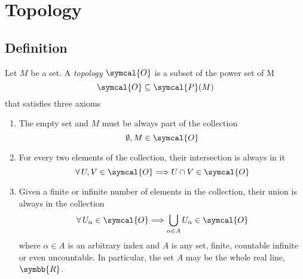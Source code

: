 \section{Topology}
\subsection{Definition}
Let $M$ be a set. A \emph{topology}\footnotemark{} $\symcal{O}$ is a subset of the power
set of M
\begin{equation}
  \symcal{O} \subseteq \symcal{P}(M)
\end{equation}
that satisfies three axioms
\begin{enumerate}
\item The empty set and $M$ must be always part of the collection
  \begin{equation}
    \emptyset , M \in \symcal{O}
  \end{equation}
  
\item For every two elements of the collection, their intersection is always in it
  \begin{equation}
    \forall\, U, V \in\symcal{O}  \Longrightarrow U \cap V \in \symcal{O}
  \end{equation}
  
\item Given a finite or infinite number of elements in the collection, their union is
always in the collection
  \begin{equation}
    \forall\, U_\alpha \in \symcal{O}  \Longrightarrow \bigcup_{\alpha\in A} U_\alpha \in \symcal{O}
  \end{equation}
  where $\alpha \in A$ is an arbitrary index and $A$ is any set, finite, countable
  infinite or even uncountable. In particular, the set $A$ may be the whole real line,
  $\symbb{R}$.
\end{enumerate}

